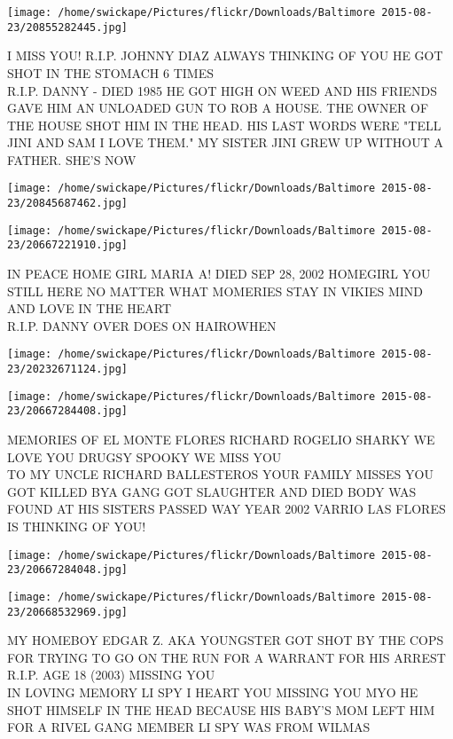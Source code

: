 \documentclass[10pt,letterpaper]{article}
\begin{document}
\vspace{0.25in}
\texttt{[image: /home/swickape/Pictures/flickr/Downloads/Baltimore 2015-08-23/20855282445.jpg]}

I MISS YOU!  R.I.P. JOHNNY DIAZ ALWAYS THINKING OF YOU HE GOT SHOT IN THE STOMACH 6 TIMES\\
R.I.P. DANNY {-} DIED 1985 HE GOT HIGH ON WEED AND HIS FRIENDS GAVE HIM AN UNLOADED GUN TO ROB A HOUSE.  THE OWNER OF THE HOUSE SHOT HIM IN THE HEAD.  HIS LAST WORDS WERE "TELL JINI AND SAM I LOVE THEM."  MY SISTER JINI GREW UP WITHOUT A FATHER.  SHE'S NOW
\pagebreak

\texttt{[image: /home/swickape/Pictures/flickr/Downloads/Baltimore 2015-08-23/20845687462.jpg]}

\vspace{0.25in}
\texttt{[image: /home/swickape/Pictures/flickr/Downloads/Baltimore 2015-08-23/20667221910.jpg]}

IN PEACE HOME GIRL MARIA A!  DIED SEP 28, 2002 HOMEGIRL YOU STILL HERE NO MATTER WHAT MOMERIES STAY IN VIKIES MIND AND LOVE IN THE HEART\\
R.I.P. DANNY OVER DOES ON HAIROWHEN
\pagebreak

\texttt{[image: /home/swickape/Pictures/flickr/Downloads/Baltimore 2015-08-23/20232671124.jpg]}

\vspace{0.25in}
\texttt{[image: /home/swickape/Pictures/flickr/Downloads/Baltimore 2015-08-23/20667284408.jpg]}

MEMORIES OF EL MONTE FLORES RICHARD ROGELIO SHARKY WE LOVE YOU DRUGSY SPOOKY WE MISS YOU\\
TO MY UNCLE RICHARD BALLESTEROS YOUR FAMILY MISSES YOU GOT KILLED BYA GANG GOT SLAUGHTER AND DIED BODY WAS FOUND AT HIS SISTERS PASSED WAY YEAR 2002 VARRIO LAS FLORES IS THINKING OF YOU!
\pagebreak

\texttt{[image: /home/swickape/Pictures/flickr/Downloads/Baltimore 2015-08-23/20667284048.jpg]}

\vspace{0.25in}
\texttt{[image: /home/swickape/Pictures/flickr/Downloads/Baltimore 2015-08-23/20668532969.jpg]}

MY HOMEBOY EDGAR Z. AKA YOUNGSTER GOT SHOT BY THE COPS FOR TRYING TO GO ON THE RUN FOR A WARRANT FOR HIS ARREST R.I.P. AGE 18 (2003) MISSING YOU\\
IN LOVING MEMORY LI SPY I HEART YOU MISSING YOU MYO HE SHOT HIMSELF IN THE HEAD BECAUSE HIS BABY'S MOM LEFT HIM FOR A RIVEL GANG MEMBER LI SPY WAS FROM WILMAS
\pagebreak
\end{document}
